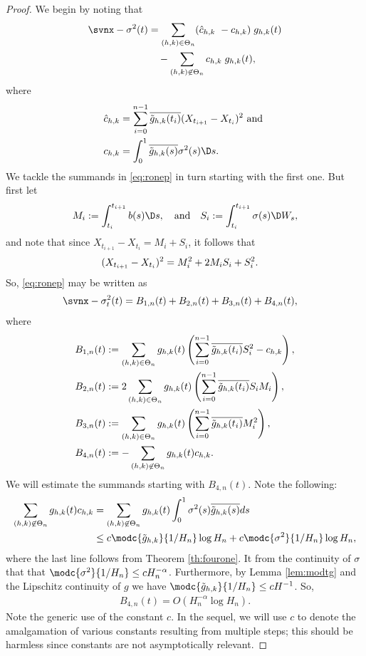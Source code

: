 \begin{proof} We begin by noting that 
\begin{align}
  \svnx - \sigma^2(t) & = \sum_{(h,k) \in \Theta_n} (\cnhk\ - \chk)\;g_{h,k}(t)\notag\\
  & \quad -\sum_{(h,k) \not\in \Theta_n} \chk\;g_{h,k}(t),\label{eq:ronep} 
\end{align}
  where 
\begin{align}  
  \cnhk &= \sum_{i =0}^{n-1} \btghki (X_{t_{i+1}} - X_{t_i})^2 \text{ and }\notag\\  
  \chk &= \int^1_0 \btghks \sigma^2(s) \D s. \notag
\end{align}
We tackle the summands in \eqref{eq:ronep} in turn starting with the first one. But first let 
\begin{align}
  M_i := \int_{t_i}^{t_{i+1}} b(s) \D s, \quad \text{and} \quad  S_i := \int_{t_i}^{t_{i+1}} \sigma(s) \D W_s, \notag
\end{align}
and note that since $X_{t_{i+1}} - X_{t_i} = M_i + S_i$, it follows that
\begin{align}
  (X_{t_{i+1}} - X_{t_i})^2 &= M_i^2  
  + 2M_iS_i +   S_i^2.\notag 
\end{align}
So, \eqref{eq:ronep} may be written as 
\begin{align}
  &\svnx - \sv(t) = B_{1,n}(t) + B_{2,n}(t) + B_{3,n}(t) + B_{4,n}(t), \notag
\end{align}
where
\begin{align}
  &B_{1,n}(t) :=  \sum_{(h,k) \in \Theta_n} g_{h,k}(t) \left(\sum_{i=0}^{n-1} \overline{\tilde{g}_{h,k}(t_i)} S_i^2  - {c}_{h,k}\right), \notag\\
  &B_{2,n}(t) := 2 \sum_{(h,k) \in \Theta_n} g_{h,k}(t)\left(\sum_{i=0}^{n-1} \overline{\tilde{g}_{h,k}(t_i)} S_i M_i \right), \notag\\
  &B_{3,n}(t) := \sum_{(h,k) \in \Theta_n} g_{h,k}(t)\left( \sum_{i=0}^{n-1} \overline{\tilde{g}_{h,k}(t_i)} M_i^2 \right), \notag\\
  &B_{4,n}(t) := - \sum_{\substack{(h,k) \not\in \Theta_n }}g_{h,k}(t){c}_{h,k}. 
  \label{}
\end{align}
We will estimate the summands starting with $B_{4,n}(t)$. Note the following:
\begin{align}
  \sum_{\substack{(h,k) \not\in \Theta_n }}g_{h,k}(t)\chk &=  \sum_{\substack{(h,k) \not\in \Theta_n }}g_{h,k}(t)\int^1_0\sigma^2 (s) { \btghks} ds \notag\\ 
&\le c\modc{\tghk}{1/H_n}\log H_n  + c\modc{\sigma^2}{1/H_n} \log H_n\notag,
\end{align}
where the last  line follows from Theorem \eqref{th:fourone}. It from the \holder continuity of $\sigma$ that  that $\modc{\sigma^2}{1/H_n} \le c H_n^{-\alpha}$. Furthermore, by Lemma \eqref{lem:modtg} and the Lipschitz continuity of $g$ we have $\modc{\tghk}{1/H_n} \le c H^{-1}$.  So,  
\begin{align}
 B_{4,n}(t) =  O( H_n^{-\alpha}\log H_n).
  \label{eq:B4}
\end{align}
Note the generic use of the constant  $c$. In the sequel, we will use $c$ to denote the amalgamation of various constants resulting from multiple steps; this should be harmless since  constants are not asymptotically relevant. 


\end{proof}
